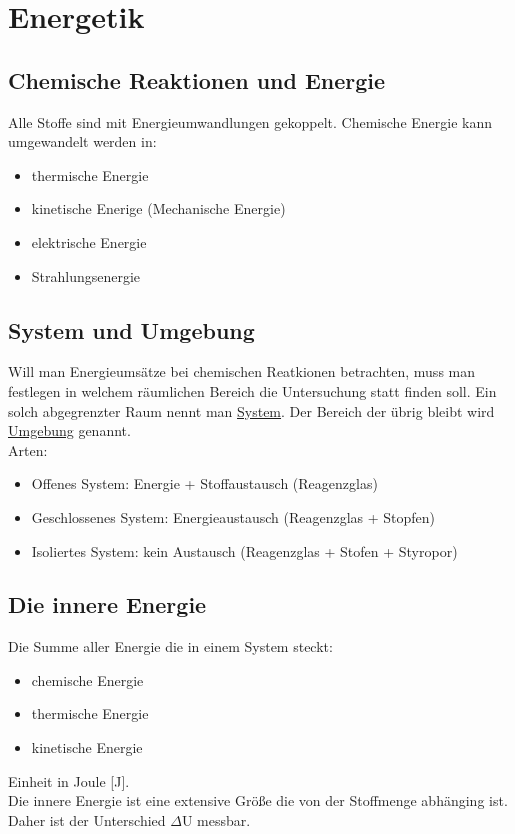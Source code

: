 
\section{Energetik} \label{sec:energetik}


\subsection{Chemische Reaktionen und Energie}
Alle Stoffe sind mit Energieumwandlungen gekoppelt.
Chemische Energie kann umgewandelt werden in:
\begin{itemize}
    \item thermische Energie
    \item kinetische Enerige (Mechanische Energie)
    \item elektrische Energie
    \item Strahlungsenergie
\end{itemize}


\subsection{System und Umgebung}
Will man Energieumsätze bei chemischen Reatkionen betrachten, muss man festlegen in welchem räumlichen Bereich die Untersuchung statt finden soll.
Ein solch abgegrenzter Raum nennt man \underline{System}. Der Bereich der übrig bleibt wird \underline{Umgebung} genannt. \\
Arten:
\begin{itemize}
    \item Offenes System: 
        Energie + Stoffaustausch (Reagenzglas)
    \item Geschlossenes System:
        Energieaustausch (Reagenzglas + Stopfen)
    \item Isoliertes System: 
        kein Austausch  (Reagenzglas + Stofen + Styropor)
\end{itemize}


\subsection{Die innere Energie}
Die Summe aller Energie die in einem System steckt:
\begin{itemize}
    \item chemische Energie
    \item thermische Energie
    \item kinetische Energie
\end{itemize}
Einheit in Joule [J].\\
Die innere Energie ist eine extensive Größe die von der Stoffmenge abhänging ist. Daher ist der Unterschied $\Delta$U messbar.


